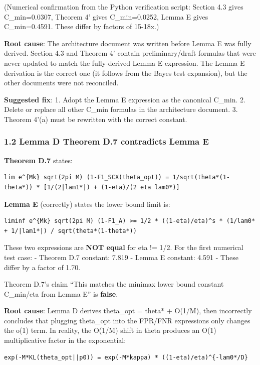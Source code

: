 \documentclass[
  12pt,
]{article}
\begin{document}
(Numerical confirmation from the Python verification script: Section 4.3
gives C\_min=0.0307, Theorem 4' gives C\_min=0.0252, Lemma E gives
C\_min=0.4591. These differ by factors of 15-18x.)

\textbf{Root cause}: The architecture document was written before Lemma
E was fully derived. Section 4.3 and Theorem 4' contain
preliminary/draft formulas that were never updated to match the
fully-derived Lemma E expression. The Lemma E derivation is the correct
one (it follows from the Bayes test expansion), but the other documents
were not reconciled.

\textbf{Suggested fix}: 1. Adopt the Lemma E expression as the canonical
C\_min. 2. Delete or replace all other C\_min formulas in the
architecture document. 3. Theorem 4'(a) must be rewritten with the
correct constant.

\subsubsection{1.2 Lemma D Theorem D.7 contradicts Lemma
E}\label{lemma-d-theorem-d.7-contradicts-lemma-e}

\textbf{Theorem D.7} states:

\begin{verbatim}
lim e^{Mk} sqrt(2pi M) (1-F1_SCX(theta_opt)) = 1/sqrt(theta*(1-theta*)) * [1/(2|lam1*|) + (1-eta)/(2 eta lam0*)]
\end{verbatim}

\textbf{Lemma E} (correctly) states the lower bound limit is:

\begin{verbatim}
liminf e^{Mk} sqrt(2pi M) (1-F1_A) >= 1/2 * ((1-eta)/eta)^s * (1/lam0* + 1/|lam1*|) / sqrt(theta*(1-theta*))
\end{verbatim}

These two expressions are \textbf{NOT equal} for eta != 1/2. For the
first numerical test case: - Theorem D.7 constant: 7.819 - Lemma E
constant: 4.591 - These differ by a factor of 1.70.

Theorem D.7's claim ``This matches the minimax lower bound constant
C\_min/eta from Lemma E'' is \textbf{false}.

\textbf{Root cause}: Lemma D derives theta\_opt = theta* + O(1/M), then
incorrectly concludes that plugging theta\_opt into the FPR/FNR
expressions only changes the o(1) term. In reality, the O(1/M) shift in
theta produces an O(1) multiplicative factor in the exponential:

\begin{verbatim}
exp(-M*KL(theta_opt||p0)) = exp(-M*kappa) * ((1-eta)/eta)^{-lam0*/D}
\end{verbatim}
\end{document}
